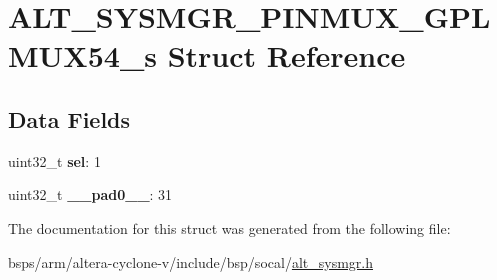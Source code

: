 \hypertarget{structALT__SYSMGR__PINMUX__GPLMUX54__s}{}\section{A\+L\+T\+\_\+\+S\+Y\+S\+M\+G\+R\+\_\+\+P\+I\+N\+M\+U\+X\+\_\+\+G\+P\+L\+M\+U\+X54\+\_\+s Struct Reference}
\label{structALT__SYSMGR__PINMUX__GPLMUX54__s}
\subsection*{Data Fields}
\begin{DoxyCompactItemize}
\item 
\mbox{\label{structALT__SYSMGR__PINMUX__GPLMUX54__s_a3ea55933e66445e6b757fa4593bf94cf}} 
uint32\+\_\+t {\bfseries sel}\+: 1
\item 
\mbox{\label{structALT__SYSMGR__PINMUX__GPLMUX54__s_a273c9e43c5351d011d5998eb6626e7e0}} 
uint32\+\_\+t {\bfseries \+\_\+\+\_\+pad0\+\_\+\+\_\+}\+: 31
\end{DoxyCompactItemize}


The documentation for this struct was generated from the following file\+:\begin{DoxyCompactItemize}
\item 
bsps/arm/altera-\/cyclone-\/v/include/bsp/socal/\mbox{\hyperlink{alt__sysmgr_8h}{alt\+\_\+sysmgr.\+h}}\end{DoxyCompactItemize}
